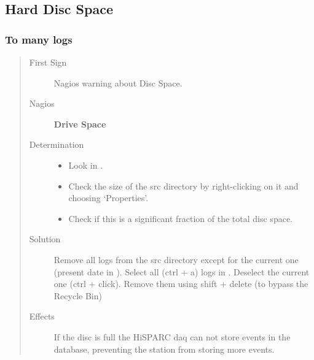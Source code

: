 \documentclass[a4paper,11pt,english]{sphinxmanual}
\begin{document}
\subsection{Hard Disc Space}
\label{known-issues:hard-disc-space}

\subsubsection{To many logs}
\label{known-issues:to-many-logs}\begin{quote}\begin{description}
\item[{First Sign}] \leavevmode
Nagios warning about Disc Space.

\item[{Nagios}] \leavevmode
\textbf{Drive Space}

\item[{Determination}] \leavevmode\begin{itemize}
\item {} 
Look in .

\item {} 
Check the size of the src directory by right-clicking on it and choosing `Properties'.

\item {} 
Check if this is a significant fraction of the total disc space.

\end{itemize}

\item[{Solution}] \leavevmode
Remove all logs from the src directory except for the current one (present date in ). Select all (ctrl + a) logs in . Deselect the current one (ctrl + click). Remove them using shift + delete (to bypass the Recycle Bin)

\item[{Effects}] \leavevmode
If the disc is full the HiSPARC daq can not store events in the database, preventing the station from storing more events.

\end{description}\end{quote}
\end{document}
